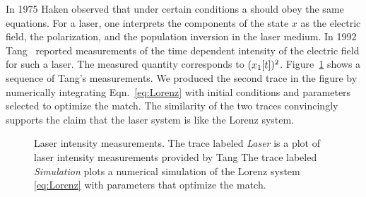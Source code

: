 In 1975 Haken\cite{Haken75} observed that under certain conditions a
 should obey the same equations.  For a laser, one
interprets the components of the state $x$ as the electric field, the
polarization, and the population inversion in the laser medium.  In
1992 %
%
Tang \etal\cite{Tang92,Tang94}\ reported measurements of the time %
dependent intensity of the electric field for such a laser.  The
measured quantity corresponds to $({x_1}{[t]})^2$.
Figure~\ref{fig:LaserLP5} shows a sequence of Tang's measurements.  We
produced the second trace in the figure by numerically integrating
Eqn.~\eqref{eq:Lorenz} with initial conditions and parameters selected
to optimize the match.  The similarity of the two traces convincingly
supports the claim that the laser system is like the Lorenz system.
\begin{figure}[htbp]
  \caption[Laser intensity measurements.]%
  {Laser intensity measurements.  The trace labeled \emph{Laser} is a
    plot of laser intensity measurements provided by Tang \etal  The
    trace labeled \emph{Simulation} plots a numerical simulation of
    the Lorenz system \eqref{eq:Lorenz} with parameters  that optimize
    the match.}
  \label{fig:LaserLP5}
\end{figure}

